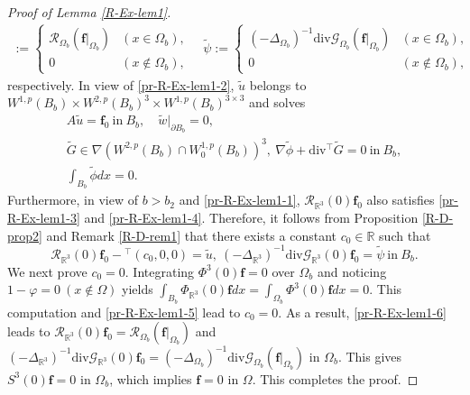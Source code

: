 \documentclass[dvipdfmx,12pt]{article}
\begin{document}
\begin{proof}[Proof of Lemma \ref{R-Ex-lem1}]
\begin{gather*}
:=
\begin{cases}
\mathcal{R}_{\Omega_{b}}(\mathbf{f}|_{\Omega_{b}}) & (x\in\Omega_{b}), \\
0 & (x\notin\Omega_{b}),
\end{cases} 
\quad
\tilde{\psi}:=
\begin{cases}
(-\Delta_{\Omega_{b}})^{-1}\mathrm{div}\mathcal{G}_{\Omega_{b}}(\mathbf{f}|_{\Omega_{b}}) & (x\in\Omega_{b}), \\
0 & (x\notin\Omega_{b}),
\end{cases}
\end{gather*}
respectively.
In view of \eqref{pr-R-Ex-lem1-2}, $\widetilde{u}$ belongs to $W^{1,p}(B_{b})\times W^{2,p}(B_{b})^3\times W^{1,p}(B_{b})^{3\times3}$ and solves
\begin{gather}
A\widetilde{u}=\mathbf{f}_0~\mathrm{in}~B_{b}, \quad
\widetilde{w}|_{\partial B_{b}}=0, \label{pr-R-Ex-lem1-3}\\
\widetilde{G}\in \nabla(W^{2,p}(B_{b})\cap W_0^{1,p}(B_{b}))^3,~\nabla\tilde{\phi}+\mathrm{div}{}^\top \tilde{G}=0~\mathrm{in}~B_b, \label{pr-R-Ex-lem1-4}\\
\int_{B_{b}}\widetilde{\phi}dx=0. \label{pr-R-Ex-lem1-5}
\end{gather}
Furthermore, in view of $b>b_2$ and \eqref{pr-R-Ex-lem1-1}, $\mathcal{R}_{\mathbb{R}^3}(0)\mathbf{f}_0$ also satisfies \eqref{pr-R-Ex-lem1-3} and \eqref{pr-R-Ex-lem1-4}. Therefore, it follows from Proposition \ref{R-D-prop2} and Remark \ref{R-D-rem1} that there exists a constant $c_0\in\mathbb{R}$ such that
\begin{equation}
\mathcal{R}_{\mathbb{R}^3}(0)\mathbf{f}_0-{}^\top(c_0,0,0)=\widetilde{u},~(-\Delta_{\mathbb{R}^3} )^{-1}\mathrm{div}\mathcal{G}_{\mathbb{R}^3}(0)\mathbf{f}_0=\widetilde{\psi}~\mathrm{in}~B_{b}. \label{pr-R-Ex-lem1-6}
\end{equation}
We next prove $c_0=0$. Integrating $\Phi^3(0)\mathbf{f}=0$ over $\Omega_{b}$ and noticing $1-\varphi=0~(x\notin \Omega)$ yields
$\int_{B_{b}} \Phi_{\mathbb{R}^3}(0)\mathbf{f} dx=\int_{\Omega_{b}} \Phi^3(0)\mathbf{f} dx =0 $.
This computation and \eqref{pr-R-Ex-lem1-5} lead to $c_0=0$. As a result, \eqref{pr-R-Ex-lem1-6} leads to $\mathcal{R}_{\mathbb{R}^3}(0)\mathbf{f}_0=\mathcal{R}_{\Omega_{b}}(\mathbf{f}|_{\Omega_{b}})$ and $(-\Delta_{\mathbb{R}^3} )^{-1}\mathrm{div}\mathcal{G}_{\mathbb{R}^3}(0)\mathbf{f}_0=(-\Delta_{\Omega_{b}})^{-1}\mathrm{div}\mathcal{G}_{\Omega_{b}}(\mathbf{f}|_{\Omega_{b}})$ in $\Omega_{b}$. This gives $S^{3}(0)\mathbf{f}=0$ in $\Omega_{b}$, which implies $\mathbf{f}=0$ in $\Omega$. This completes the proof.
\end{proof}
\end{document}
